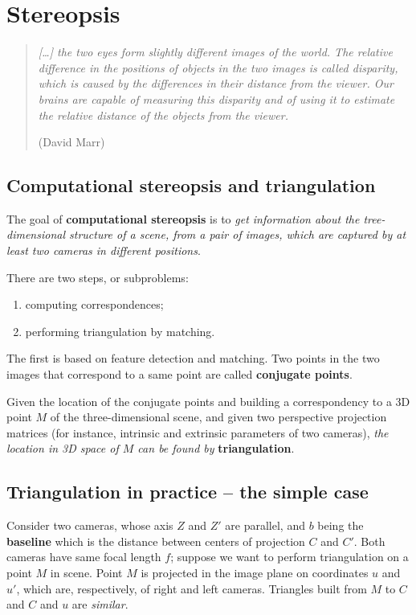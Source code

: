\documentclass[10pt]{report}
\begin{document}
\section{Stereopsis}
\label{sec:org69f9dde}
\begin{quote}
\emph{[\dots{}] the two eyes form slightly different images of the world. The relative difference in the positions of
objects in the two images is called disparity, which is caused by the differences in their distance from
the viewer. Our brains are capable of measuring this disparity and of using it to estimate the relative
distance of the objects from the viewer.}

(David Marr)
\end{quote}
\subsection{Computational stereopsis and triangulation}
\label{sec:org3f4ae64}
The goal of \textbf{computational stereopsis} is to \emph{get information about the
tree-dimensional structure of a scene, from a pair of images, which are
captured by at least two cameras in different positions}.

There are two steps, or subproblems:

\begin{enumerate}
\item computing correspondences;
\item performing triangulation by matching.
\end{enumerate}

The first is based on feature detection and matching. Two points in the
two images that correspond to a same point are called \textbf{conjugate
points}.

Given the location of the conjugate points and building a correspondency
to a 3D point \(M\) of the three-dimensional scene, and given two
perspective projection matrices (for instance, intrinsic and extrinsic
parameters of two cameras), \emph{the location in 3D space of \(M\) can be
found by} \textbf{triangulation}.

\subsection{Triangulation in practice -- the simple case}
\label{sec:orgbe76566}
Consider two cameras, whose axis \(Z\) and \(Z'\) are parallel, and
\(b\) being the \textbf{baseline} which is the distance between centers of
projection \(C\) and \(C'\). Both cameras have same focal length \(f\);
suppose we want to perform triangulation on a point \(M\) in scene.
Point \(M\) is projected in the image plane on coordinates \(u\) and
\(u'\), which are, respectively, of right and left cameras. Triangles
built from \(M\) to \(C\) and \(C\) and \(u\) are \emph{similar}.
\end{document}
